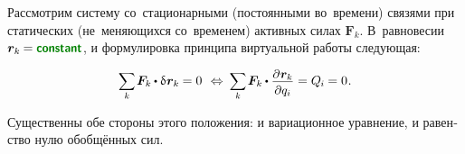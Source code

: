 

\label{para:statics}

\begin{otherlanguage}{russian}

Рассмотрим систему со~стационарными (постоянными во~времени) связями при статических (не~меняющихся со~временем) активных силах ${\bm{F}_k}$. В~равновесии ${\bm{r}_k \hspace{-0.12ex} = \boldconstant}$, и формулировка принципа виртуальной работы следующая:

\nopagebreak\vspace{-0.1em}\begin{equation}\label{statics.discrete:principleofvirtualwork}
\scalebox{0.92}[0.96]{$ \displaystyle \sum_{\smash{k}} $} \hspace{.25ex}
\bm{F}_k \hspace{-0.1ex} \dotp \variation{\hspace{.1ex}\bm{r}_k} \hspace{-0.1ex} = 0
\:\,\Leftrightarrow\:
\scalebox{0.92}[0.96]{$ \displaystyle \sum_{\smash{k}} $} \hspace{.25ex}
\bm{F}_k \hspace{-0.1ex} \dotp \scalebox{0.96}{$ \displaystyle \frac{\raisemath{-0.12em}{\partial \hspace{.1ex} \bm{r}_k}}{\raisemath{-0.1em}{\partial q_i}} $}
= Q_{\hspace{-0.1ex}i} \hspace{-0.1ex} = 0 \hspace{.1ex} .
\vspace{-0.1em}\end{equation}

\vspace{-0.15em} \noindent Существенны обе стороны этого положения: и вариационное уравнение, и равенство нулю обобщённых сил.


\end{otherlanguage}
